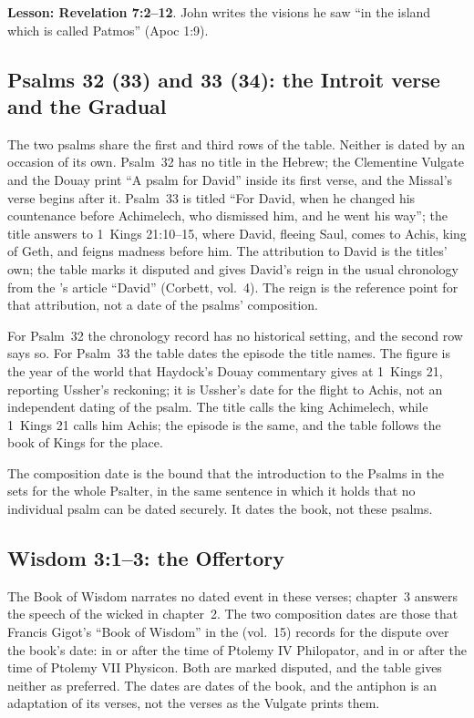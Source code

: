 \noindent\textbf{Lesson: Revelation 7:2--12}. John writes the visions he saw ``in the island which is called Patmos'' (Apoc 1:9).


\subsection{Psalms 32 (33) and 33 (34): the Introit verse and the Gradual}
\label{sec:date-psalms}

The two psalms share the first and third rows of the table. Neither is dated
by an occasion of its own. Psalm~32 has no title in the Hebrew; the
Clementine Vulgate and the Douay print ``A psalm for David'' inside its first
verse, and the Missal's verse begins after it. Psalm~33 is titled ``For
David, when he changed his countenance before Achimelech, who dismissed him,
and he went his way''; the title answers to 1~Kings 21:10--15, where David,
fleeing Saul, comes to Achis, king of Geth, and feigns madness before him.
The attribution to David is the titles' own; the table marks it disputed and gives David's reign in the usual chronology from
the 's article ``David'' (Corbett, vol.~4). The
reign is the reference point for that attribution, not a date of the psalms'
composition.

For Psalm~32 the chronology record has no historical setting, and the second
row says so. For Psalm~33 the table dates the episode the title names. The
figure is the year of the world that Haydock's Douay commentary gives at
1~Kings 21, reporting Ussher's reckoning; it is Ussher's date for
the flight to Achis, not an independent dating of the psalm. The title calls
the king Achimelech, while 1~Kings 21 calls him Achis; the episode is the
same, and the table follows the book of Kings for the place.

The composition date is the bound that the introduction to the Psalms in the
 sets for the whole Psalter, in the
same sentence in which it holds that no individual psalm can be dated
securely. It dates the book, not these psalms.

\subsection{Wisdom 3:1--3: the Offertory}
\label{sec:date-wisdom}

The Book of Wisdom narrates no dated event in these verses; chapter~3 answers
the speech of the wicked in chapter~2. The two composition dates are those
that Francis Gigot's ``Book of Wisdom'' in the 
(vol.~15) records for the dispute over the book's date: in or after the time
of Ptolemy IV Philopator, and in or after the time of Ptolemy VII Physicon.
Both are marked disputed, and
the table gives neither as preferred. The dates are dates of the book, and
the antiphon is an adaptation of its verses, not the verses as the Vulgate
prints them.

